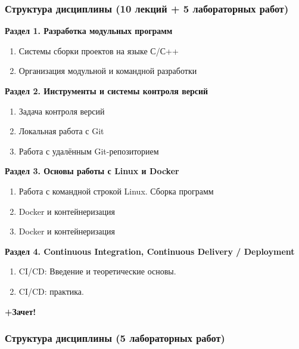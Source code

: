 \documentclass[10pt, aspectratio=1610]{beamer}
\begin{document}
\begin{frame}\frametitle{Структура дисциплины (10 лекций + 5 лабораторных работ)}
	
		
	\textbf{Раздел 1. Разработка модульных программ}
	\begin{enumerate}
		\item Системы сборки проектов на языке С/С++
		\item Организация модульной и командной разработки
		\global\edef\tmp{\theenumi}
	\end{enumerate}
	
	\textbf{Раздел 2. Инструменты и системы контроля версий}
	\begin{enumerate}\setcounter{enumi}{\tmp}
		\item Задача контроля версий
		\item Локальная работа с Git
		\item Работа с удалённым Git-репозиторием
		\global\edef\tmp{\theenumi}
	\end{enumerate}
	
	
	\textbf{Раздел 3. Основы работы с Linux и Docker}
	\begin{enumerate}\setcounter{enumi}{\tmp}
		\item Работа с командной строкой Linux. Сборка программ
		\item Docker и контейнеризация
		\item Docker и контейнеризация
		\global\edef\tmp{\theenumi}
	\end{enumerate}
		
	\textbf{Раздел 4. Continuous Integration, Continuous Delivery / Deployment}
	\begin{enumerate}\setcounter{enumi}{\tmp}
		\item CI/CD: Введение и теоретические основы.
		\item CI/CD: практика.
		\global\edef\tmp{\theenumi}
	\end{enumerate}
	
	\textbf{\Large +Зачет!} 
	
\end{frame}


\begin{frame}\frametitle{Структура дисциплины (5 лабораторных работ)}
	
\end{frame}
\end{document}
